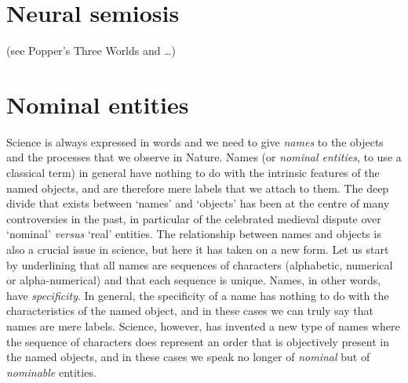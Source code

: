 \documentclass[12pt]{article}
\begin{document}
\section{Neural semiosis} (see Popper's Three Worlds and …)	 


\section{Nominal entities}
Science is always expressed in words and we need to give \textit{names} to the objects and the processes that we observe in Nature. Names (or \textit{nominal entities}, to use a classical term) in general have nothing to do with the intrinsic features of the named objects, and are therefore mere labels that we attach to them. The deep divide that exists between `names' and `objects' has been at the centre of many controversies in the past, in particular of the celebrated medieval dispute over `nominal' \textit{versus} `real' entities. The relationship between names and objects is also a crucial issue in science, but here it has taken on a new form. Let us start by underlining that all names are sequences of characters (alphabetic, numerical or alpha-numerical) and that each sequence is unique. Names, in other words, have \textit{specificity}. In general, the specificity of a name has nothing to do with the characteristics of the named object, and in these cases we can truly say that names are mere labels. Science, however, has invented a new type of names where the sequence of characters does represent an order that is objectively present in the named objects, and in these cases we speak no longer of \textit{nominal} but of \textit{nominable} entities. 

\hypertarget{nominable_entity}{}
\end{document}
